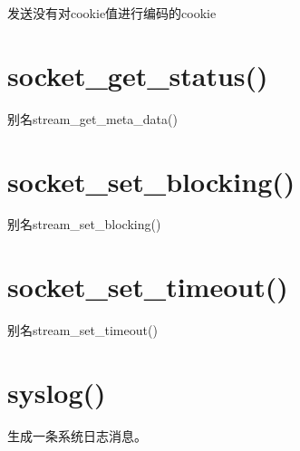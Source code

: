 发送没有对cookie值进行编码的cookie


\section{socket\_get\_status()}

别名stream\_get\_meta\_data()

\section{socket\_set\_blocking()}

别名stream\_set\_blocking()

\section{socket\_set\_timeout()}

别名stream\_set\_timeout()

\section{syslog()}

生成一条系统日志消息。


















